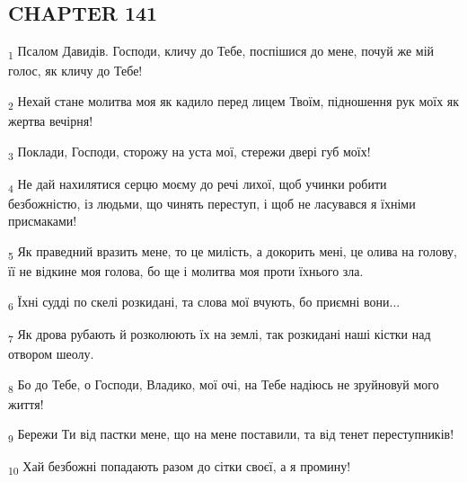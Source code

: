 \subsection{CHAPTER 141}
\begin{tcolorbox}
\textsubscript{1} Псалом Давидів. Господи, кличу до Тебе, поспішися до мене, почуй же мій голос, як кличу до Тебе!
\end{tcolorbox}
\begin{tcolorbox}
\textsubscript{2} Нехай стане молитва моя як кадило перед лицем Твоїм, підношення рук моїх як жертва вечірня!
\end{tcolorbox}
\begin{tcolorbox}
\textsubscript{3} Поклади, Господи, сторожу на уста мої, стережи двері губ моїх!
\end{tcolorbox}
\begin{tcolorbox}
\textsubscript{4} Не дай нахилятися серцю моєму до речі лихої, щоб учинки робити безбожністю, із людьми, що чинять переступ, і щоб не ласувався я їхніми присмаками!
\end{tcolorbox}
\begin{tcolorbox}
\textsubscript{5} Як праведний вразить мене, то це милість, а докорить мені, це олива на голову, її не відкине моя голова, бо ще і молитва моя проти їхнього зла.
\end{tcolorbox}
\begin{tcolorbox}
\textsubscript{6} Їхні судді по скелі розкидані, та слова мої вчують, бо приємні вони...
\end{tcolorbox}
\begin{tcolorbox}
\textsubscript{7} Як дрова рубають й розколюють їх на землі, так розкидані наші кістки над отвором шеолу.
\end{tcolorbox}
\begin{tcolorbox}
\textsubscript{8} Бо до Тебе, о Господи, Владико, мої очі, на Тебе надіюсь не зруйновуй мого життя!
\end{tcolorbox}
\begin{tcolorbox}
\textsubscript{9} Бережи Ти від пастки мене, що на мене поставили, та від тенет переступників!
\end{tcolorbox}
\begin{tcolorbox}
\textsubscript{10} Хай безбожні попадають разом до сітки своєї, а я промину!
\end{tcolorbox}
